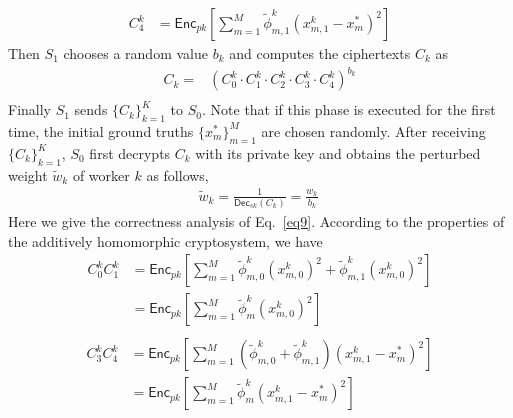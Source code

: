 \documentclass[conference]{IEEEtran}
\begin{document}
\begin{equation}
  \begin{split}
    C_4^k & = \mathsf{Enc}_{pk}\left[\sum_{m=1}^M \tilde{\phi}_{m,1}^k \left(x_{m,1}^k - x_m^*\right)^2\right]
  \end{split}
\end{equation}
Then $S_1$ chooses a random value $b_k$ and computes the ciphertexts $C_k$ as 
\begin{equation}
  \begin{split}
    C_k = & \left(C_0^k\cdot C_1^k\cdot C_2^k\cdot C_3^k \cdot C_4^k\right)^{b_k} \\
  \end{split}
\end{equation}
Finally $S_1$ sends $\{C_k\}_{k=1}^K$ to $S_0$.
Note that if this phase is executed for the first time, the initial ground truths $\{x_m^*\}_{m=1}^M$ are chosen randomly.
After receiving $\{C_k\}_{k=1}^K$, $S_0$ first decrypts $C_k$ with its private key and obtains the perturbed weight $\tilde{w}_k$ of worker $k$ as follows,
\begin{equation}
  \begin{split}
    \tilde{w}_k = \frac{1}{\mathsf{Dec}_{sk}\left(C_k\right)} = \frac{w_k}{b_k}
  ~\label{eq9}
  \end{split}
\end{equation}
Here we give the correctness analysis of Eq.~\ref{eq9}.
According to the properties of the additively homomorphic cryptosystem, we have
\begin{equation}
  \begin{split}
  C_0^k C_1^k & = \mathsf{Enc}_{pk}\left[\sum_{m=1}^M \tilde{\phi}_{m,0}^k\left(x_{m,0}^k\right)^2 + \tilde{\phi}_{m,1}^k\left(x_{m,0}^k\right)^2  \right] \\
   & = \mathsf{Enc}_{pk}\left[\sum_{m=1}^M \tilde{\phi}_m^k\left(x_{m,0}^k\right)^2 \right] \\
  \end{split}
\end{equation}
\begin{equation}
  \begin{split}
  C_3^kC_4^k & = \mathsf{Enc}_{pk}\left[\sum_{m=1}^M \left(\tilde{\phi}_{m,0}^k + \tilde{\phi}_{m,1}^k\right) \left(x_{m,1}^k-x_m^*\right)^2 \right] \\
  & = \mathsf{Enc}_{pk}\left[\sum_{m=1}^M \tilde{\phi}_m^k\left(x_{m,1}^k - x_m^*\right)^2\right] \\
  \end{split}
\end{equation}
\end{document}
